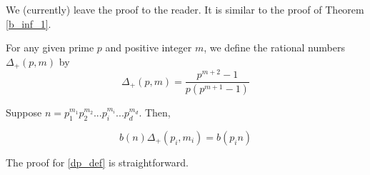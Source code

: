 \documentclass[../paper.tex]{article}
\begin{document}
We (currently) leave the proof to the reader. It is 
similar to the proof of Theorem {\ref{b_inf_1}}.

For any given prime $p$ and positive integer $m$, we define the
rational numbers $\Delta_+(p,m)$ by
$$\Delta_+(p,m) = \frac{p^{m+2} - 1}{ p (p^{m + 1} -
1)}$$

\begin{theorem}[Property]\label{dp_def}
Suppose $n = p_1^{m_1} p_2^{m_2} ... p_i^{m_i} ... p_d^{m_d}$.
Then,

$$ b(n) \Delta_+(p_i, m_i) = b(p_i n)$$

\end{theorem}

The proof for {\ref{dp_def}} is straightforward.
\end{document}
